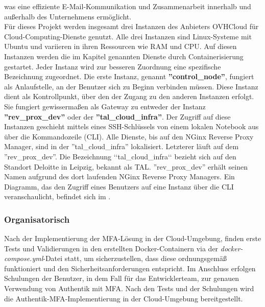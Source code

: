 was eine effiziente E-Mail-Kommunikation und Zusammenarbeit innerhalb und außerhalb des Unternehmens ermöglicht.
\\Für dieses Projekt werden insgesamt drei Instanzen des Anbieters OVHCloud für Cloud-Computing-Dienste genutzt. 
Alle drei Instanzen sind Linux-Systeme mit Ubuntu und variieren in ihren Ressourcen wie RAM und CPU. Auf 
diesen Instanzen werden die im Kapitel genannten Dienste durch Containerisierung gestartet. Jeder Instanz 
wird zur besseren Zuordnung eine spezifische Bezeichnung zugeordnet.
Die erste Instanz, genannt \textbf{''control\_node''}, fungiert als Anlaufstelle, an der Benutzer sich zu Beginn verbinden müssen.
Diese Instanz dient als Kontrollpunkt, über den der Zugang zu den anderen Instanzen erfolgt. Sie fungiert 
gewissermaßen als Gateway zu entweder der Instanz \textbf{''rev\_prox\_dev''} oder der \textbf{''tal\_cloud\_infra''}. 
Der Zugriff auf diese Instanzen geschieht mittels eines \acs{SSH}-Schlüssels von einem lokalen Notebook aus über die Kommandozeile (CLI).
Alle Dienste, bis auf den NGinx Reverse Proxy Manager, sind in der ''tal\_cloud\_infra'' lokalisiert. 
Letzterer läuft auf dem ''rev\_prox\_dev''. Die Bezeichnung ‘‘tal\_cloud\_infra‘‘ bezieht sich auf den Standort Deloitte in Leipzig, bekannt als \acs{TAL}. 
''rev\_prox\_dev'' erhält seinen Namen aufgrund des dort laufenden NGinx Reverse Proxy Managers. Ein Diagramm, das den Zugriff eines Benutzers auf eine Instanz  
über die CLI veranschaulicht, befindet sich im  .


\subsubsection{Organisatorisch}
\label{sec:Organisatorisch}
Nach der Implementierung der MFA-Lösung in der Cloud-Umgebung, finden erste Tests und Validierungen in den erstellten 
Docker-Containern via der \textit{docker-compose.yml}-Datei statt, um sicherzustellen, dass diese ordnungsgemäß funktioniert und den 
Sicherheitsanforderungen entspricht. 
Im Anschluss erfolgen Schulungen der Benutzer, in dem Fall für das Entwicklerteam, zur genauen Verwendung von Authentik mit \acs{MFA}. 
Nach den Tests und der Schulungen wird die Authentik-\acs{MFA}-Implementierung in der Cloud-Umgebung bereitgestellt.

